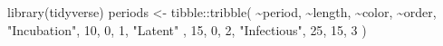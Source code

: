 \documentclass[
  letterpaper,
  DIV=11,
  numbers=noendperiod]{scrreprt}
\newenvironment{Shaded}{\begin{snugshade}}{\end{snugshade}}
\newcommand{\DecValTok}[1]{\textcolor[rgb]{0.68,0.00,0.00}{#1}}
\newcommand{\FunctionTok}[1]{\textcolor[rgb]{0.28,0.35,0.67}{#1}}
\newcommand{\NormalTok}[1]{\textcolor[rgb]{0.00,0.23,0.31}{#1}}
\newcommand{\OtherTok}[1]{\textcolor[rgb]{0.00,0.23,0.31}{#1}}
\newcommand{\SpecialCharTok}[1]{\textcolor[rgb]{0.37,0.37,0.37}{#1}}
\newcommand{\StringTok}[1]{\textcolor[rgb]{0.13,0.47,0.30}{#1}}
\begin{document}
\begin{Shaded}
\begin{Highlighting}[]
\FunctionTok{library}\NormalTok{(tidyverse)}
\NormalTok{periods }\OtherTok{\textless{}{-}}\NormalTok{ tibble}\SpecialCharTok{::}\FunctionTok{tribble}\NormalTok{(}
  \SpecialCharTok{\textasciitilde{}}\NormalTok{period, }\SpecialCharTok{\textasciitilde{}}\NormalTok{length, }\SpecialCharTok{\textasciitilde{}}\NormalTok{color, }\SpecialCharTok{\textasciitilde{}}\NormalTok{order,}
  \StringTok{"Incubation"}\NormalTok{, }\DecValTok{10}\NormalTok{, }\DecValTok{0}\NormalTok{, }\DecValTok{1}\NormalTok{,}
  \StringTok{"Latent"}\NormalTok{ , }\DecValTok{15}\NormalTok{, }\DecValTok{0}\NormalTok{, }\DecValTok{2}\NormalTok{,}
  \StringTok{"Infectious"}\NormalTok{, }\DecValTok{25}\NormalTok{, }\DecValTok{15}\NormalTok{, }\DecValTok{3}
\NormalTok{)}


\end{Highlighting}
\end{Shaded}
\end{document}
